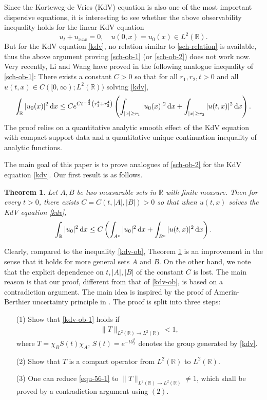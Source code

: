 \documentclass[12pt]{amsart}
\def\R {\mathbb{R}}
\def\d{{\,\rm d}}
\newtheorem{theorem}[proposition]{Theorem}
\theoremstyle{definition}
\numberwithin{equation}{section}
\begin{document}
Since the Korteweg-de Vries (KdV) equation is also one of the most important dispersive equations, it is interesting to see whether the above observability inequality holds for  the linear  KdV  equation
\begin{equation}\label{kdv}
u_t+u_{xxx}=0, \quad u(0,x)=u_0(x)\in L^2(\R).
\end{equation}
But for the KdV equation \eqref{kdv}, no relation similar to \eqref{sch-relation} is available, thus the above argument proving \eqref{sch-ob-1} (or \eqref{sch-ob-2}) does not work now. Very recently,  Li and  Wang have proved in \cite{LW} the following analogue inequality of \eqref{sch-ob-1}: There exists a constant $C>0$ so that for all $r_1,r_2,t>0$ and all $u(t,x)\in C([0,\infty);L^2(\R))$ solving \eqref{kdv},
\begin{equation}\label{kdv-ob}
    \int_{\R}|u_0(x)|^2\d x\le Ce^{Ct^{-\frac{4}{3}}\left(r_1^4+r_2^4\right)}\left(\int_{|x|\ge r_1}|u_0(x)|^2\d x+\int _{|x|\ge r_2}|u(t,x)|^2\d x\right).
\end{equation}
The proof relies on a quantitative analytic smooth effect of the KdV equation with compact support data and a quantitative unique continuation inequality of analytic functions.

The main goal of this paper is to prove analogues of \eqref{sch-ob-2} for the KdV equation \eqref{kdv}. Our first result is as follows.
\begin{theorem}\label{thm-1}
    Let $A,B$ be two  measurable sets in $\R$ with finite measure. Then for every $t>0$, there exists $C=C(t,|A|,|B|)>0$ so that when $u(t,x)$ solves the KdV equation \eqref{kdv},
    \begin{equation}\label{kdv-ob-1}
    \int_\R |u_0|^2\d x \leq C\left( \int_{A^c}|u_0|^2\d x + \int_{B^c}|u(t,x)|^2\d x \right).
    \end{equation}
    \end{theorem}

Clearly, compared to the inequality \eqref{kdv-ob}, Theorem \ref{thm-1} is an improvement in the sense that it holds for more general sets $A$ and $B$. On the other hand, we note that the explicit dependence on $t,|A|,|B|$ of the constant $C$ is lost. The main reason is that our proof, different from that of \eqref{kdv-ob}, is based on a contradiction argument. The main idea is inspired by the proof of Amerin-Berthier uncertainty principle in \cite{Amrein}. The proof is split into three steps:
\begin{itemize}
  \item [(1)] Show that \eqref{kdv-ob-1} holds if
\begin{align}\label{equ-56-1}
  \|T\|_{L^2(\R)\to L^2(\R)}<1,
\end{align}
  where $T=\chi_BS(t)\chi_A$, $S(t)=e^{-t\partial_x^3}$ denotes the group generated by \eqref{kdv}.
  \item [(2)] Show that $T$ is a compact operator from $L^2(\R)$ to $L^2(\R)$.
  \item [(3)] One can reduce \eqref{equ-56-1} to $\|T\|_{L^2(\R)\to L^2(\R)}\neq 1$, which shall be proved by a contradiction argument using $(2)$.
\end{itemize}
\end{document}
